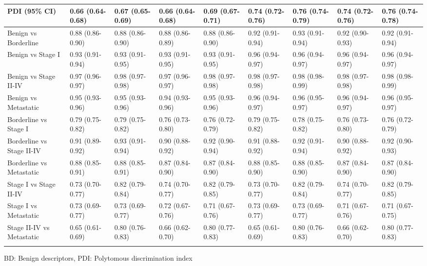 \begin{table}
\begin{tabularx}{\textheight}{X|XXXX|XXXX}
        PDI (95\% CI) & 0.66 (0.64-0.68) & 0.67 (0.65-0.69) & 0.66 (0.64-0.68) & 0.69 (0.67-0.71) & 0.74 (0.72-0.76) & 0.76 (0.74-0.79) & 0.74 (0.72-0.76) & 0.76 (0.74-0.78) \\ 
        \midrule
        Benign vs Borderline & 0.88 (0.86-0.90) & 0.88 (0.86-0.90) & 0.88 (0.86-0.89) & 0.88 (0.86-0.90) & 0.92 (0.91-0.94) & 0.93 (0.91-0.94) & 0.92 (0.90-0.93) & 0.92 (0.91-0.94) \\ 
        Benign vs Stage I & 0.93 (0.91-0.94) & 0.93 (0.91-0.95) & 0.93 (0.91-0.95) & 0.93 (0.91-0.95) & 0.96 (0.94-0.97) & 0.96 (0.94-0.97) & 0.96 (0.94-0.97) & 0.96 (0.94-0.97) \\ 
        Benign vs Stage II-IV & 0.97 (0.96-0.97) & 0.98 (0.97-0.98) & 0.97 (0.96-0.97) & 0.98 (0.97-0.98) & 0.98 (0.97-0.98) & 0.98 (0.98-0.99) & 0.98 (0.97-0.98) & 0.98 (0.98-0.99) \\ 
        Benign vs Metastatic & 0.95 (0.93-0.96) & 0.95 (0.93-0.96) & 0.94 (0.93-0.96) & 0.95 (0.93-0.96) & 0.96 (0.94-0.97) & 0.96 (0.95-0.97) & 0.96 (0.94-0.97) & 0.96 (0.95-0.97) \\ 
        Borderline vs Stage I & 0.79 (0.75-0.82) & 0.79 (0.75-0.82) & 0.76 (0.73-0.80) & 0.76 (0.72-0.79) & 0.79 (0.75-0.82) & 0.78 (0.75-0.82) & 0.76 (0.73-0.80) & 0.76 (0.72-0.79) \\ 
        Borderline vs Stage II-IV & 0.91 (0.89-0.92) & 0.93 (0.91-0.94) & 0.90 (0.88-0.92) & 0.92 (0.90-0.94) & 0.91 (0.88-0.92) & 0.92 (0.91-0.94) & 0.90 (0.88-0.92) & 0.92 (0.90-0.93) \\ 
        Borderline vs Metastatic & 0.88 (0.85-0.91) & 0.88 (0.85-0.91) & 0.87 (0.84-0.90) & 0.87 (0.84-0.90) & 0.88 (0.85-0.90) & 0.88 (0.85-0.90) & 0.87 (0.84-0.90) & 0.87 (0.84-0.90) \\ 
        Stage I vs Stage II-IV & 0.73 (0.70-0.77) & 0.82 (0.79-0.84) & 0.74 (0.70-0.77) & 0.82 (0.79-0.85) & 0.73 (0.70-0.77) & 0.82 (0.79-0.84) & 0.74 (0.70-0.77) & 0.82 (0.79-0.85) \\ 
        Stage I vs Metastatic & 0.73 (0.69-0.77) & 0.73 (0.69-0.77) & 0.72 (0.67-0.76) & 0.71 (0.67-0.76) & 0.73 (0.69-0.77) & 0.73 (0.69-0.77) & 0.71 (0.67-0.76) & 0.71 (0.67-0.75) \\ 
        Stage II-IV vs Metastatic & 0.65 (0.61-0.69) & 0.80 (0.76-0.83) & 0.66 (0.62-0.70) & 0.80 (0.77-0.83) & 0.65 (0.61-0.69) & 0.80 (0.76-0.83) & 0.66 (0.62-0.70) & 0.80 (0.77-0.83) \\ 
        \bottomrule
        \addlinespace[0.5em]
    \end{tabularx}
\footnotesize \raggedright BD: Benign descriptors, PDI: Polytomous discrimination index
\end{table}


